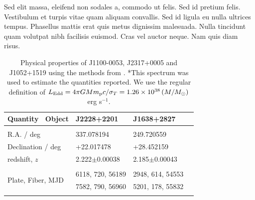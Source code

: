 \documentclass[a4paper,fleqn,usenatbib]{mnras}
\begin{document}
Sed elit massa, eleifend non sodales a, commodo ut felis. Sed id
pretium felis. Vestibulum et turpis vitae quam aliquam convallis. Sed
id ligula eu nulla ultrices tempus. Phasellus mattis erat quis metus
dignissim malesuada. Nulla tincidunt quam volutpat nibh facilisis
euismod. Cras vel auctor neque. Nam quis diam risus.

\begin{table}
 \centering
 \begin{tabular}{l l l l}
  \hline \hline 
   Quantity \ Object                           & J2228+2201     &  J1638+2827 \\
 \hline 
    &&\\
    R.A. / deg                                        &    337.078194      &  249.720559\\
    Declination / deg                            &    +22.017478      &  +28.452159 \\
    redshift, $z$                                    &   2.222$\pm$0.00038   &  2.185$\pm$0.00043          \\
    &&\\ 
    \multirow{2}{*}{Plate, Fiber, MJD}   & 6118, 720, 56189	     &  2948, 614, 54553	  \\
                                         & 7582, 790, 56960	     & 5201, 178, 55832 \\    
    &&\\
    \hline \hline 
  \end{tabular}
  \caption{Physical properties of J1100-0053, J2317+0005 and J1052+1519 using the
    methods from \citet{Shen2011}. *This spectrum was used to estimate
    the quantities reported.  We use the regular definition of $L_{\rm
      Edd} = 4 \pi G M m_{\rm p} c /\sigma_{T} =
    1.26\times10^{38}\left (M/M_{\odot} \right )$ erg s$^{-1}$.} 
 \label{tab:Shen_props}
\end{table}
\end{document}
